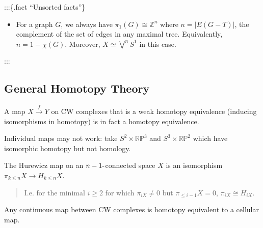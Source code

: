 :::\{.fact ``Unsorted facts''\} \envlist

\begin{itemize}
\tightlist
\item
  For a graph \(G\), we always have \(\pi_{1}(G) \cong {\mathbb{Z}}^n\)
  where \(n = |E(G - T)|\), the complement of the set of edges in any
  maximal tree. Equivalently, \(n = 1-\chi(G)\). Moreover,
  \(X \simeq\bigvee^n S^1\) in this case.
\end{itemize}

:::

\hypertarget{general-homotopy-theory}{%
\subsection{General Homotopy Theory}\label{general-homotopy-theory}}

\begin{theorem}

A map \(X \xrightarrow{f} Y\) on CW complexes that is a weak homotopy
equivalence (inducing isomorphisms in homotopy) is in fact a homotopy
equivalence.

\end{theorem}

\begin{warnings}

Individual maps may not work: take \(S^2 \times{\mathbb{RP}}^3\) and
\(S^3 \times{\mathbb{RP}}^2\) which have isomorphic homotopy but not
homology.

\end{warnings}

\begin{theorem}[Hurewicz]

The Hurewicz map on an \(n-1{\hbox{-}}\)connected space \(X\) is an
isomorphism \(\pi_{k\leq n}X \to H_{k\leq n} X\).

\begin{quote}
I.e. for the minimal \(i\geq 2\) for which \(\pi_{iX} \neq 0\) but
\(\pi_{\leq i-1}X = 0\), \(\pi_{iX} \cong H_{iX}\).
\end{quote}

\end{theorem}

\begin{theorem}

Any continuous map between CW complexes is homotopy equivalent to a
cellular map.

\end{theorem}

